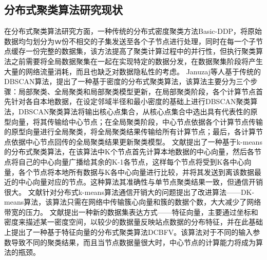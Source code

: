\subsection{分布式聚类算法研究现状}
在分布式聚类算法研究方面，一种传统的分布式密度聚类方法Basic-DDP，将原始数据均匀划分为ｗ份不相交的子集发送至各个子节点进行处理，同时在每一个子节点缓存一份完整的数据集，该方法提高了聚类计算过程中的并行性，但执行聚类算法之前需要将全局数据聚集在一起在实现特定的数据分发，在数据聚集阶段将产生大量的网络流量消耗，而且也缺乏对数据隐私性的考虑。
Januzaj等人基于传统的DBSCAN算法，提出了一种基于密度的分布式聚类算法，该算法主要分为三个步骤：局部聚类、全局聚类和局部聚类模型更新，在局部聚类阶段，各个计算节点首先针对各自本地数据，在设定邻域半径和最小密度的基础上进行DBSCAN聚类算法，DBSCAN聚类算法将输出核心点集合，从核心点集合中选出具有代表性的原型向量，将其传输给中心节点；在全局聚类阶段，中心节点依据各个计算节点传输的原型向量进行全局聚类，将全局聚类结果传输给所有计算节点；最后，各计算节点依据中心节点回传的全局聚类结果更新聚类模型。
文献\cite{kantabutra2000parallel}提出了一种基于k-means的分布式聚类算法，在该算法中K个节点首先计算本地数据的中心向量，然后各节点将自己的中心向量广播给其余的K-1各节点，这样每个节点将受到K各中心向量，各个节点将本地所有数据与K各中心向量进行比较，并将其发送到离该数据最近的中心向量对应的节点。这种算法其准确性与单节点聚类结果一致，但通信开销很大。
文献\cite{郑苗苗2007DK}针对分布式k-means算法通信开销大的问题提出了改进算法——DK-means算法，该算法只需在网络中传输簇心向量和簇的数据个数，大大减少了网络带宽的压力。
文献\cite{李锁花基于特征向量的分布式聚类算法}提出一种新的数据集表达方式——特征向量，主要通过坐标和密度来描述某一密度空间，以较少的数据量反映站点数据的分布特征，并在此基础上提出了一种基于特征向量的分布式聚类算法DCBFV。该算法对于不同的输入参数导致不同的聚类结果，而且当节点数据量很大时，中心节点的计算能力将成为算法的瓶颈。

